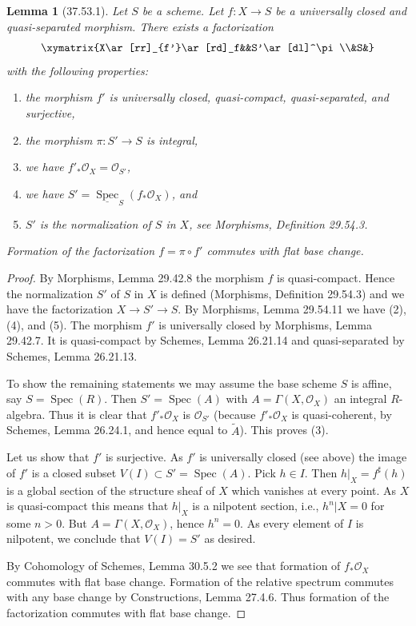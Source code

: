 \documentclass[UTF8,11pt]{ctexart}
\newtheorem*{lemma}{Lemma}
\theoremstyle{definition}
\DeclareMathOperator{\Spec}{Spec}
\begin{document}
\begin{lemma}[37.53.1]
Let $S$ be a scheme. Let $f:X\to S$ be a universally closed and quasi-separated morphism. There exists a factorization
\[\xymatrix{X\ar[rr]_{f'}\ar[rd]_f&&S'\ar[dl]^\pi\\&S&}\]
with the following properties:
\begin{enumerate}
\item the morphism $f'$ is universally closed, quasi-compact, quasi-separated, and surjective,
\item the morphism $\pi:S'\to S$ is integral,
\item we have $f'_*\mathcal O_X=\mathcal O_{S'}$,
\item we have $S'=\underline{\Spec}_S(f_*\mathcal O_X)$, and
\item $S'$ is the normalization of $S$ in $X$, see Morphisms, Definition 29.54.3.
\end{enumerate}
Formation of the factorization $f=\pi\circ f'$ commutes with flat base change.
\end{lemma}
\begin{proof}
By Morphisms, Lemma 29.42.8 the morphism $f$ is quasi-compact. Hence the normalization $S'$ of $S$ in $X$ is defined (Morphisms, Definition 29.54.3) and we have the factorization $X\to S'\to S$. By Morphisms, Lemma 29.54.11 we have (2), (4), and (5). The morphism $f'$ is universally closed by Morphisms, Lemma 29.42.7. It is quasi-compact by Schemes, Lemma 26.21.14 and quasi-separated by Schemes, Lemma 26.21.13.

To show the remaining statements we may assume the base scheme $S$ is affine, say $S=\Spec(R)$. Then $S'=\Spec(A)$ with $A=\Gamma(X,\mathcal O_X)$ an integral $R$-algebra. Thus it is clear that $f'_*\mathcal O_X$ is $\mathcal O_{S'}$ (because $f'_*\mathcal O_X$ is quasi-coherent, by Schemes, Lemma 26.24.1, and hence equal to $\widetilde A$). This proves (3).

Let us show that $f'$ is surjective. As $f'$ is universally closed (see above) the image of $f'$ is a closed subset $V(I)\subset S'=\Spec(A)$. Pick $h\in I$. Then $h|_X=f^\sharp(h)$ is a global section of the structure sheaf of $X$ which vanishes at every point. As $X$ is quasi-compact this means that $h|_X$ is a nilpotent section, i.e., $h^n|X=0$ for some $n>0$. But $A=\Gamma(X,\mathcal O_X)$, hence $h^n=0$. As every element of $I$ is nilpotent, we conclude that $V(I)=S'$ as desired.

By Cohomology of Schemes, Lemma 30.5.2 we see that formation of $f_*\mathcal O_X$ commutes with flat base change. Formation of the relative spectrum commutes with any base change by Constructions, Lemma 27.4.6. Thus formation of the factorization commutes with flat base change.
\end{proof}
\end{document}

